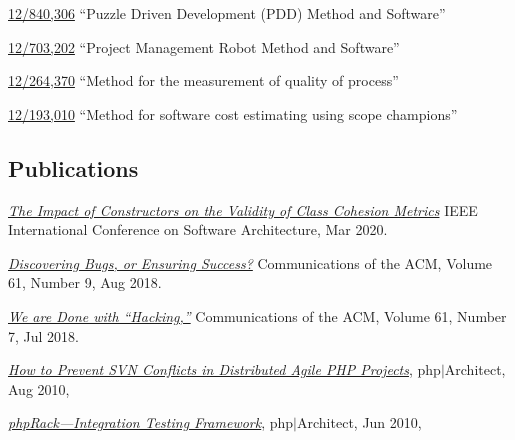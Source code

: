 \href{https://patents.google.com/patent/US20120023476}{12/840,306}
``Puzzle Driven Development (PDD) Method and Software''

\href{https://patents.google.com/patent/US20110196798}{12/703,202}
``Project Management Robot Method and Software''

\href{https://patents.google.com/patent/US20100114638}{12/264,370}
``Method for the measurement of quality of process''

\href{https://patents.google.com/patent/US20100042968}{12/193,010}
``Method for software cost estimating using scope champions''

\subsection*{Publications}

\begin{samepage}
\emph{\href{https://www.yegor256.com/pdf/2020/icsa20.pdf}{The Impact of Constructors on the Validity of Class Cohesion Metrics}}\newline
IEEE International Conference on Software Architecture, Mar 2020.
\end{samepage}

\begin{samepage}
\emph{\href{https://www.yegor256.com/pdf/2018/discovering-bugs.pdf}{Discovering Bugs, or Ensuring Success?}}\newline
Communications of the ACM, Volume 61, Number 9, Aug 2018.
\end{samepage}

\begin{samepage}
\emph{\href{https://www.yegor256.com/pdf/2018/we-are-done-with-hacking.pdf}{We are Done with ``Hacking,''}}\newline
Communications of the ACM, Volume 61, Number 7, Jul 2018.
\end{samepage}

\begin{samepage}
\emph{\href{https://www.yegor256.com/pdf/2010/phpArchitect-conflicts.pdf}{How to Prevent SVN Conflicts in Distributed Agile PHP Projects}},\newline
php$|$Architect, Aug 2010,
\end{samepage}

\begin{samepage}
\emph{\href{https://www.yegor256.com/pdf/2010/phpArchitect-phpRack.pdf}{phpRack---Integration Testing Framework}},\newline
php$|$Architect, Jun 2010,
\end{samepage}

